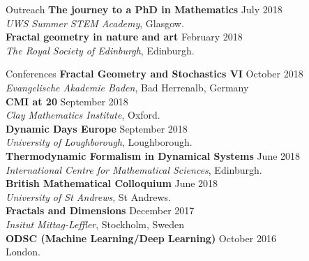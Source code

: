 \documentclass{resume} %
\begin{document}
\begin{rSection}{Outreach}
\textbf{The journey to a PhD in Mathematics} \hfill July 2018 \\\emph{UWS Summer STEM Academy}, Glasgow.\\
\textbf{Fractal geometry in nature and art} \hfill February 2018\\ \emph{The Royal Society of Edinburgh}, Edinburgh.\\
\end{rSection}

\begin{rSection}{Conferences} \itemsep -3pt 
{\textbf{Fractal Geometry and Stochastics VI}} \hfill October 2018\\ \emph{Evangelische Akademie Baden}, Bad Herrenalb, Germany\\ 
{\textbf{CMI at 20}} \hfill September 2018\\ \emph{Clay Mathematics Institute}, Oxford.\\ 
{\textbf{Dynamic Days Europe}} \hfill September 2018\\ \emph{University of Loughborough}, Loughborough.\\ 
{\textbf{Thermodynamic Formalism in Dynamical Systems}} \hfill June 2018\\ \emph{International Centre for Mathematical Sciences}, Edinburgh.\\ 
{\textbf{British Mathematical Colloquium}} \hfill June 2018\\ \emph{University of St Andrews}, {St Andrews.} \\ 
{\textbf{Fractals and Dimensions}} \hfill December 2017\\ \emph{Insitut Mittag-Leffler},{ Stockholm, Sweden} \\ 
{\textbf{ODSC (Machine Learning/Deep Learning)}} \hfill October 2016\\ London.  \\ 
\end{rSection}  
\end{document}
